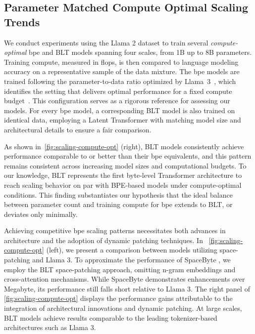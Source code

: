 \subsection{Parameter Matched Compute Optimal Scaling Trends}
\label{section:parameter-matched-scaling}
We conduct experiments using the Llama 2 dataset to train several \textit{compute-optimal} bpe and {\textsc BLT} models spanning four scales, from 1B up to 8B parameters. Training compute, measured in flops, is then compared to language modeling accuracy on a representative sample of the data mixture. The bpe models are trained following the parameter-to-data ratio optimized by Llama~3~\citep{dubey2024llama}, which identifies the setting that delivers optimal performance for a fixed compute budget~\citep{hoffmann2022training}. This configuration serves as a rigorous reference for assessing our models. For every bpe model, a corresponding {\textsc BLT} model is also trained on identical data, employing a Latent Transformer with matching model size and architectural details to ensure a fair comparison.

As shown in~\autoref{fig:scaling-compute-opt} (right), {\textsc BLT} models consistently achieve performance comparable to or better than their bpe equivalents, and this pattern remains consistent across increasing model sizes and computational budgets. To our knowledge, {\textsc BLT} represents the first byte-level Transformer architecture to reach scaling behavior on par with BPE-based models under compute-optimal conditions. This finding substantiates our hypothesis that the ideal balance between parameter count and training compute for bpe extends to {\textsc BLT}, or deviates only minimally.

Achieving competitive bpe scaling patterns necessitates both advances in architecture and the adoption of dynamic patching techniques. In ~\autoref{fig:scaling-compute-opt} (left), we present a comparison between models utilizing space-patching and Llama 3. To approximate the performance of SpaceByte \citep{slagle2024spacebyte}, we employ the {\textsc BLT} space-patching approach, omitting n-gram embeddings and cross-attention mechanisms. While SpaceByte demonstrates enhancements over Megabyte, its performance still falls short relative to Llama 3. The right panel of \autoref{fig:scaling-compute-opt} displays the performance gains attributable to the integration of architectural innovations and dynamic patching. At large scales, {\textsc BLT} models achieve results comparable to the leading tokenizer-based architectures such as Llama 3.

